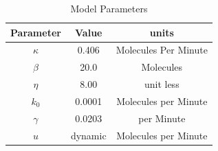 \documentclass[12pt]{article}
\begin{document}
\begin{table}[]
\caption{Model Parameters}
\begin{center}
\begin{tabular}{|c|c|c|}
\hline
Parameter & Value   & units                     \\ \hline
$\kappa$         & 0.406   & Molecules Per Minute \\
$\beta$          & 20.0    & Molecules            \\
$\eta $           & 8.00    & unit less          \\
$k_0$           & 0.0001  & Molecules per Minute \\
$\gamma$         & 0.0203  & per Minute         \\
$u$              & dynamic & Molecules per Minute \\ \hline
\end{tabular}
\label{table}
\end{center}
\vspace{-0.2in}
\end{table}
\end{document}
